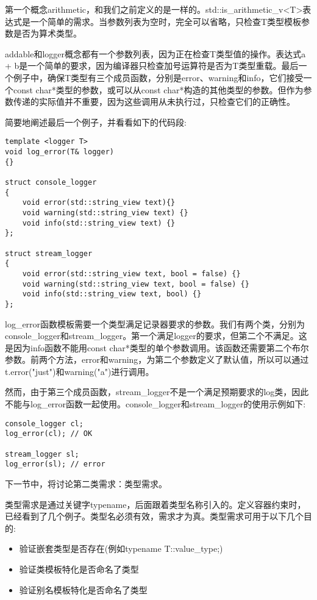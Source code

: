 第一个概念arithmetic，和我们之前定义的是一样的。std::is\_arithmetic\_v<T>表达式是一个简单的需求。当参数列表为空时，完全可以省略，只检查T类型模板参数是否为算术类型。

addable和logger概念都有一个参数列表，因为正在检查T类型值的操作。表达式a + b是一个简单的要求，因为编译器只检查加号运算符是否为T类型重载。最后一个例子中，确保T类型有三个成员函数，分别是error、warning和info，它们接受一个const char*类型的参数，或可以从const char*构造的其他类型的参数。但作为参数传递的实际值并不重要，因为这些调用从未执行过，只检查它们的正确性。

简要地阐述最后一个例子，并看看如下的代码段:

\begin{lstlisting}[style=styleCXX]
template <logger T>
void log_error(T& logger)
{}

struct console_logger
{
	void error(std::string_view text){}
	void warning(std::string_view text) {}
	void info(std::string_view text) {}
};

struct stream_logger
{
	void error(std::string_view text, bool = false) {}
	void warning(std::string_view text, bool = false) {}
	void info(std::string_view text, bool) {}
};
\end{lstlisting}

log\_error函数模板需要一个类型满足记录器要求的参数。我们有两个类，分别为console\_logger和stream\_logger。第一个满足logger的要求，但第二个不满足。这是因为info函数不能用const char*类型的单个参数调用。该函数还需要第二个布尔参数。前两个方法，error和warning，为第二个参数定义了默认值，所以可以通过t.error("just")和warning("a")进行调用。

然而，由于第三个成员函数，stream\_logger不是一个满足预期要求的log类，因此不能与log\_error函数一起使用。console\_logger和stream\_logger的使用示例如下:

\begin{lstlisting}[style=styleCXX]
console_logger cl;
log_error(cl); // OK

stream_logger sl;
log_error(sl); // error
\end{lstlisting}

下一节中，将讨论第二类需求：类型需求。


类型需求是通过关键字typename，后面跟着类型名称引入的。定义容器约束时，已经看到了几个例子。类型名必须有效，需求才为真。类型需求可用于以下几个目的:

\begin{itemize}
\item
验证嵌套类型是否存在(例如typename T::value\_type;)

\item
验证类模板特化是否命名了类型

\item
验证别名模板特化是否命名了类型
\end{itemize}

